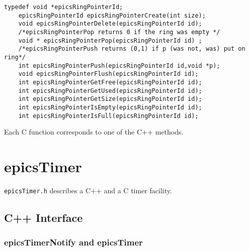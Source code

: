 \begin{verbatim}
typedef void *epicsRingPointerId;
    epicsRingPointerId epicsRingPointerCreate(int size);
    void epicsRingPointerDelete(epicsRingPointerId id);
    /*epicsRingPointerPop returns 0 if the ring was empty */
    void * epicsRingPointerPop(epicsRingPointerId id) ;
    /*epicsRingPointerPush returns (0,1) if p (was not, was) put on ring*/
    int epicsRingPointerPush(epicsRingPointerId id,void *p);
    void epicsRingPointerFlush(epicsRingPointerId id);
    int epicsRingPointerGetFree(epicsRingPointerId id);
    int epicsRingPointerGetUsed(epicsRingPointerId id);
    int epicsRingPointerGetSize(epicsRingPointerId id);
    int epicsRingPointerIsEmpty(epicsRingPointerId id);
    int epicsRingPointerIsFull(epicsRingPointerId id);
\end{verbatim}

Each C function corresponds to one of the C++ methods.

\section{epicsTimer}

\verb|epicsTimer.h| describes a C++ and a C timer facility.

\subsection{C++ Interface}

\subsubsection{epicsTimerNotify and epicsTimer}

